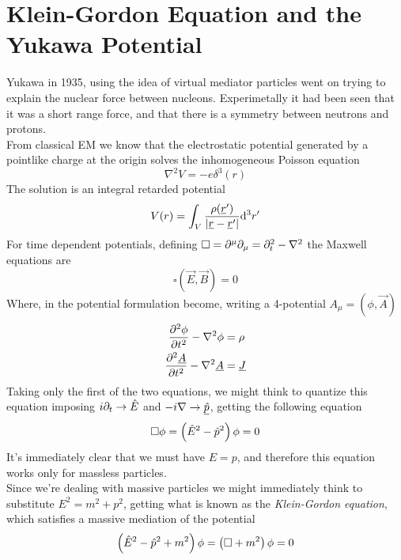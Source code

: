 \documentclass[../qm.tex]{subfiles}
\begin{document}
\section{Klein-Gordon Equation and the Yukawa Potential}
Yukawa in 1935, using the idea of virtual mediator particles went on trying to explain the nuclear force between nucleons. Experimetally it had been seen that it was a short range force, and that there is a symmetry between neutrons and protons.\\
From classical EM we know that the electrostatic potential generated by a pointlike charge at the origin solves the inhomogeneous Poisson equation
\begin{equation}
	\nabla^2V=-e\delta^3(r)
	\label{eq:empoissoneq}
\end{equation}
The solution is an integral retarded potential
\begin{equation}
	V(r)=\int_{V}^{}\frac{\rho(\underline{r}')}{\abs{\underline{r}-\underline{r}'}}\dd^3r'
	\label{eq:retespot}
\end{equation}
For time dependent potentials, defining $\square=\partial^\mu\partial_\mu=\partial_t^2-\nabla^2$ the Maxwell equations are
\begin{equation}
	\square\left( \vec{E},\vec{B} \right)=0
	\label{eq:maxwelleq}
\end{equation}
Where, in the potential formulation become, writing a 4-potential $A_\mu=(\phi,\vec{A})$
\begin{equation}
	\begin{aligned}
		\pdv[2]{\phi}{t}-\nabla^2\phi&=\rho\\
		\pdv[2]{\underline{A}}{t}-\nabla^2\underline{A}&=\underline{J}
	\end{aligned}
	\label{eq:maxwelleqpot}
\end{equation}
Taking only the first of the two equations, we might think to quantize this equation imposing $i\partial_t\to\hat{E}$ and $-i\nabla\to\underline{\hat{p}}$, getting the following equation
\begin{equation}
	\square\phi=\left( \hat{E}^2-\hat{p}^2 \right)\phi=0
	\label{eq:scalarpotquant}
\end{equation}
It's immediately clear that we must have $E=p$, and therefore this equation works only for massless particles.\\
Since we're dealing with massive particles we might immediately think to substitute $E^2=m^2+p^2$, getting what is known as the \emph{Klein-Gordon equation}, which satisfies a massive mediation of the potential
\begin{equation}
	\left( \hat{E}^2-\hat{p}^2+m^2 \right)\phi=\left( \square+m^2 \right)\phi=0
	\label{eq:kleingordoneq}
\end{equation}
\end{document}
